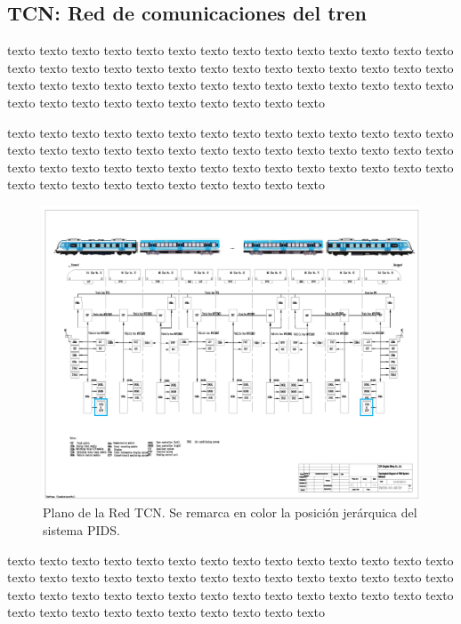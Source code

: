 \documentclass[
11pt, %
]{charter}
\begin{document}
\subsection{TCN: Red de comunicaciones del tren}

texto texto texto texto texto texto texto texto texto texto texto texto texto texto texto texto texto texto texto texto texto texto texto texto texto texto texto texto texto texto texto texto texto texto texto texto texto texto texto texto texto texto texto texto texto texto texto texto texto texto texto texto 


texto texto texto texto texto texto texto texto texto texto texto texto texto texto texto texto texto texto texto texto texto texto texto texto texto texto texto texto texto texto texto texto texto texto texto texto texto texto texto texto texto texto texto texto texto texto texto texto texto texto texto texto 


\begin{figure}[htpb]
\centering 
\includegraphics[width=1\textwidth]{./Pics/diagramaTrenesArgentinos_TCN_PIDS.png}
\caption{Plano de la Red TCN. Se remarca en color la posición jerárquica del sistema PIDS.}
\label{fig:Red TCN}
\end{figure}


texto texto texto texto texto texto texto texto texto texto texto texto texto texto texto texto texto texto texto texto texto texto texto texto texto texto texto texto texto texto texto texto texto texto texto texto texto texto texto texto texto texto texto texto texto texto texto texto texto texto texto texto 
\end{document}
